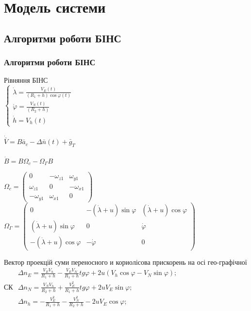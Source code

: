 \documentclass[ucs,compress]{beamer}    %
\begin{document}
\section{Модель системи }

\subsection{Алгоритми роботи БІНС} 
\begin{frame}[plain,shrink=10]
\frametitle{Алгоритми роботи БІНС}
\tiny
\begin{exampleblock}{Рівняння БІНС}
\\
$\left\{ \begin{array}{l} 
{\dot{\lambda }=\frac{V_{E} \left(t\right)}{\left(R_{1} +h\right)\cos \varphi \left(t\right)} } \\ 
{\dot{\varphi }=\frac{V_{N} \left(t\right)}{\left(R_{2} +h\right)} } \\ 
{\dot{h}=V_{h} \left(t\right)} \end{array}\right .$    \\ 
\\
$\dot{\bar{V}}=B\bar{a}{}_{c} -\Delta \bar{n}\left(t\right)+\bar{g}_{T} $\\
\\
$\dot{B}=B\Omega _{c} -\Omega _{\Gamma } B$\\
\end{exampleblock}

$\Omega_{c} =\left(\begin{array}{ccc} 
{0} & {-\omega_{z1} } & {\omega_{y1} } \\ 
{\omega_{z1} } & {0} & {-\omega_{x1} } \\ 
{-\omega_{y1} } & {\omega_{x1}} & {0} 
\end{array}\right)$ $\Omega _{\Gamma } =\left(\begin{array}{ccc} 
{0} & {-\left(\dot{\lambda }+u\right)\sin \varphi } & {\left(\dot{\lambda }+u\right)\cos \varphi } \\ {\left(\dot{\lambda }+u\right)\sin \varphi } & {0} & {\dot{\varphi }} \\ 
{-\left(\dot{\lambda }+u\right)\cos \varphi } & {-\dot{\varphi }} & {0} 
\end{array}\right)$ 

Вектор проекцій суми переносного и кориолісова прискорень на осі гео-графічної СК
$\begin{array}{l} 
{\Delta n_{E} =\frac{V_{E} V_{h} }{R_{1} +h} -\frac{V_{E} V_{N} }{R_{1} +h} tg\varphi +2u\left(V_{h} \cos \varphi -V_{N} \sin \varphi \right);} \\ 
{\Delta n_{N} =\frac{V_{N} V_{h} }{R_{2} +h} +\frac{V_{E}^{2} }{R_{1} +h} tg\varphi +2uV_{E} \sin \varphi ;} \\ {\Delta n_{h} =-\frac{V_{E}^{2} }{R_{1} +h} -\frac{V_{N}^{2} }{R_{2} +h} -2uV_{E} \cos \varphi ;} 
\end{array}$


\end{frame}
\end{document}
